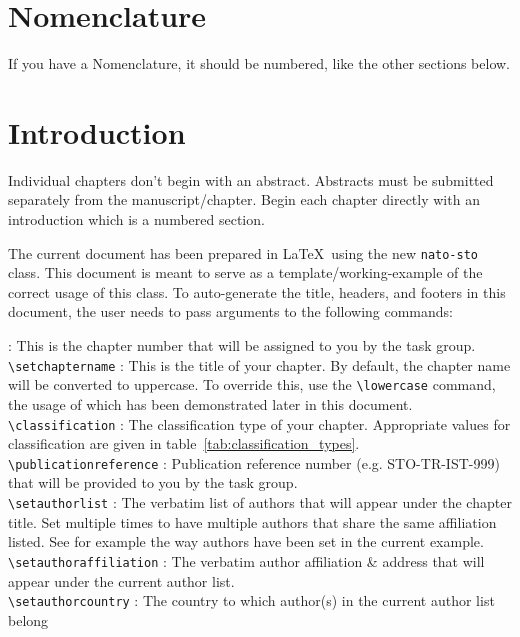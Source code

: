 \documentclass{nato-sto}
\begin{document}
\maketitle

\section{Nomenclature}

If you have a Nomenclature, it should be numbered, like the other sections below.

\section{Introduction}

Individual chapters don't begin with an abstract. Abstracts must be submitted separately from the manuscript/chapter. Begin each chapter directly with an introduction which is a numbered section. 

\noindent The current document has been prepared in \LaTeX ~using the new \verb|nato-sto| class. This document is meant to serve as a template/working-example of the correct usage of this class. To auto-generate the title, headers, and footers in this document, the user needs to pass arguments to the following commands:

\noindent {\verb|\setchapternumber|} : This is the chapter number that will be assigned to you by the task group.\\
{\verb|\setchaptername|} : This is the title of your chapter. By default, the chapter name will be converted to uppercase. To override this, use the \verb|\lowercase| command, the usage of which has been demonstrated later in this document.\\
{\verb|\classification|} : The classification type of your chapter. Appropriate values for classification are given in table~\ref{tab:classification_types}.\\
{\verb|\publicationreference|} : Publication reference number (e.g. STO-TR-IST-999) that will be provided to you by the task group.\\
{\verb|\setauthorlist|} : The verbatim list of authors that will appear under the chapter title. Set multiple times to have multiple authors that share the same affiliation listed. See for example the way authors have been set in the current example.\\
{\verb|\setauthoraffiliation|} : The verbatim author affiliation \& address that will appear under the current author list. \\
{\verb|\setauthorcountry|} : The country to which author(s) in the current author list belong
\end{document}
